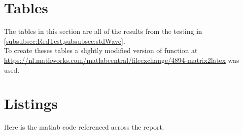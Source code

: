 \documentclass[a4paper]{article}
\begin{document}
	\newpage

	\appendix
	
	\section{Tables}
	The tables in this section are all of the results from the testing in \cref{subsubsec:RedTest,subsubsec:stdWave}. \\
	To create theses tables a slightly modified version of function at \url{https://nl.mathworks.com/matlabcentral/fileexchange/4894-matrix2latex} was used.
	
	
	
	
	
	
	
	
	\section{Listings}

	Here is the matlab code referenced across the report.

	

	
	
	
	
	

	
	
	
	
	

	
		
	


 
\end{document}
